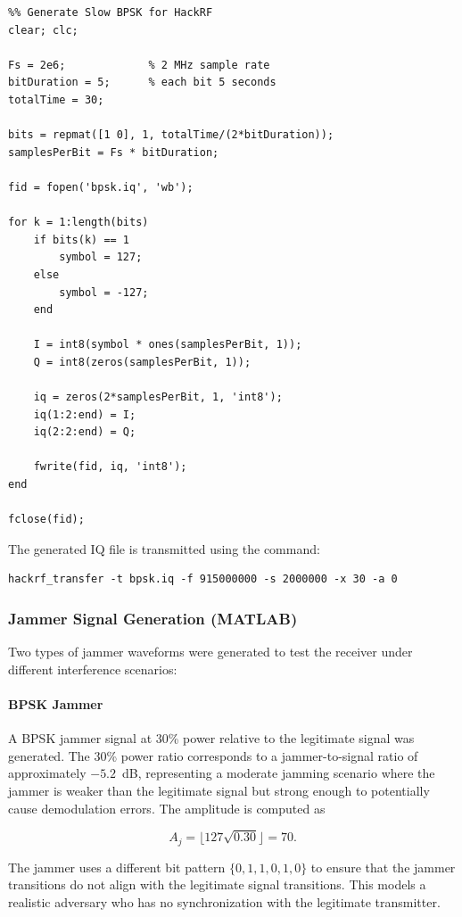 \documentclass{article}
\begin{document}
\begin{verbatim}
%% Generate Slow BPSK for HackRF
clear; clc;

Fs = 2e6;             % 2 MHz sample rate
bitDuration = 5;      % each bit 5 seconds
totalTime = 30;

bits = repmat([1 0], 1, totalTime/(2*bitDuration));
samplesPerBit = Fs * bitDuration;

fid = fopen('bpsk.iq', 'wb');

for k = 1:length(bits)
    if bits(k) == 1
        symbol = 127;
    else
        symbol = -127;
    end

    I = int8(symbol * ones(samplesPerBit, 1));
    Q = int8(zeros(samplesPerBit, 1));

    iq = zeros(2*samplesPerBit, 1, 'int8');
    iq(1:2:end) = I;
    iq(2:2:end) = Q;

    fwrite(fid, iq, 'int8');
end

fclose(fid);
\end{verbatim}

The generated IQ file is transmitted using the command:

\begin{verbatim}
hackrf_transfer -t bpsk.iq -f 915000000 -s 2000000 -x 30 -a 0
\end{verbatim}

\subsubsection{Jammer Signal Generation (MATLAB)}

Two types of jammer waveforms were generated to test the receiver under different interference scenarios:

\paragraph{BPSK Jammer}

A BPSK jammer signal at 30\% power relative to the legitimate signal was generated. The 30\% power ratio corresponds to a jammer-to-signal ratio of approximately $-5.2$~dB, representing a moderate jamming scenario where the jammer is weaker than the legitimate signal but strong enough to potentially cause demodulation errors. The amplitude is computed as

\begin{equation}
A_j = \lfloor 127 \sqrt{0.30} \rfloor = 70.
\end{equation}

The jammer uses a different bit pattern $\{0, 1, 1, 0, 1, 0\}$ to ensure that the jammer transitions do not align with the legitimate signal transitions. This models a realistic adversary who has no synchronization with the legitimate transmitter.
\end{document}

